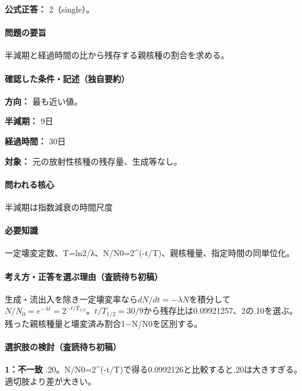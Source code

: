 \textbf{公式正答：} 2（single）。

\paragraph{問題の要旨} 半減期と経過時間の比から残存する親核種の割合を求める。

\paragraph{確認した条件・記述（独自要約）}\mbox{}\par

\noindent\textbf{方向：} 最も近い値。\par

\noindent\textbf{半減期：} 9日\par

\noindent\textbf{経過時間：} 30日\par

\noindent\textbf{対象：} 元の放射性核種の残存量、生成等なし。\par

\paragraph{問われる核心} 半減期は指数減衰の時間尺度

\paragraph{必要知識} 一定壊変定数、T=\allowbreak{}ln2/λ、N/N0=\allowbreak{}2\textasciicircum{}(-t/T)、親核種量、指定時間の同単位化。

\paragraph{考え方・正答を選ぶ理由（査読待ち初稿）} 生成・流出入を除き一定壊変率なら\(dN/dt=-\lambda N\)を積分して\(N/N_0=e^{-\lambda t}=2^{-t/T_{1/2}}\)。\(t/T_{1/2}=30/9\)から残存比は0.09921257、2の.10を選ぶ。残った親核種量と壊変済み割合1−N/N0を区別する。

\paragraph{選択肢の検討（査読待ち初稿）}\mbox{}\par

\noindent\textbf{1：不一致} .20。N/N0=\allowbreak{}2\textasciicircum{}(-t/T)で得る0.0992126と比較すると.20は大きすぎる。 適切肢より差が大きい。\par

